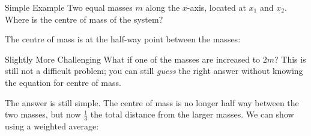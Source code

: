 \documentclass[12pt,compress,aspectratio=169]{beamer}
\begin{document}
\begin{frame}{Simple Example}
  Two equal masses $m$ along the $x$-axis, located at $x_1$ and $x_2$. Where is
  the centre of mass of the system?
  \begin{center}
  \end{center}
  The centre of mass is at the half-way point between the masses:

\end{frame}



\begin{frame}{Slightly More Challenging}
  What if one of the masses are increased to $2m$? This is still not a
  difficult problem; you can still \emph{guess} the right answer without
  knowing the equation for centre of mass. 
  \begin{center}
  \end{center}
  The answer is still simple. The centre of mass is no longer half way between
  the two masses, but now $\frac13$ the total distance from the larger masses.
  We can show using a weighted average:
  
\end{frame}
\end{document}
